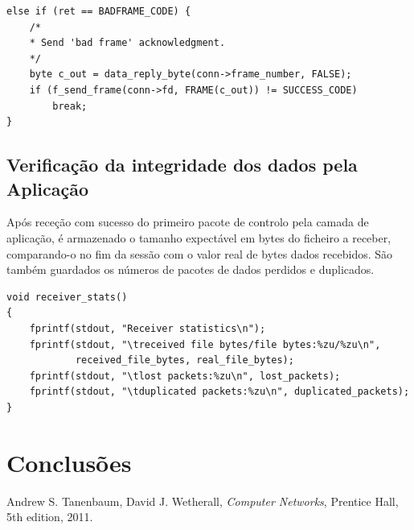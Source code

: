 \documentclass[a4paper,11pt,titlepage]{article}
\begin{document}
\begin{verbatim}
else if (ret == BADFRAME_CODE) {
    /*
    * Send 'bad frame' acknowledgment.
    */
    byte c_out = data_reply_byte(conn->frame_number, FALSE);
    if (f_send_frame(conn->fd, FRAME(c_out)) != SUCCESS_CODE)
        break;
}
\end{verbatim}

\subsection{Verificação da integridade dos dados pela Aplicação}
Após receção com sucesso do primeiro pacote de controlo pela camada de aplicação, é armazenado o tamanho expectável em bytes do ficheiro a receber, comparando-o no fim da sessão com o valor real de bytes dados recebidos. São também guardados os números de pacotes de dados perdidos e duplicados.

\begin{verbatim}
void receiver_stats()
{
    fprintf(stdout, "Receiver statistics\n");
    fprintf(stdout, "\treceived file bytes/file bytes:%zu/%zu\n",
            received_file_bytes, real_file_bytes);
    fprintf(stdout, "\tlost packets:%zu\n", lost_packets);
    fprintf(stdout, "\tduplicated packets:%zu\n", duplicated_packets);
}
\end{verbatim}

\section{Conclusões}

\begin{thebibliography}{9}
  Andrew S. Tanenbaum,
  David J. Wetherall,
  \emph{Computer Networks},
  Prentice Hall, 
  5th edition,
  2011.
\end{thebibliography}
\end{document}
